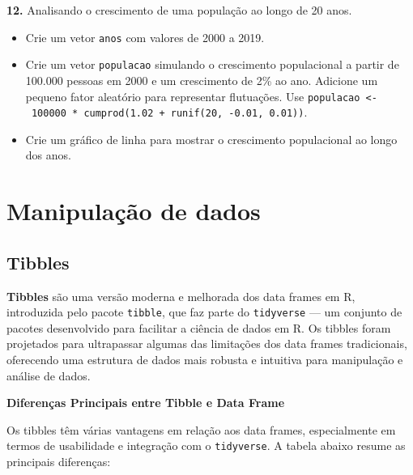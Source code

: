 \documentclass[
]{book}
\providecommand{\tightlist}{%
  \setlength{\itemsep}{0pt}\setlength{\parskip}{0pt}}
\begin{document}
\textbf{12.} Analisando o crescimento de uma população ao longo de 20 anos.

\begin{itemize}
\tightlist
\item
  Crie um vetor \texttt{anos} com valores de 2000 a 2019.
\item
  Crie um vetor \texttt{populacao} simulando o crescimento populacional a partir de 100.000 pessoas em 2000 e um crescimento de 2\% ao ano. Adicione um pequeno fator aleatório para representar flutuações. Use \texttt{populacao\ \textless{}-\ 100000\ *\ cumprod(1.02\ +\ runif(20,\ -0.01,\ 0.01))}.
\item
  Crie um gráfico de linha para mostrar o crescimento populacional ao longo dos anos.
\end{itemize}

\chapter{Manipulação de dados}\label{manipulauxe7uxe3o-de-dados}

\section{Tibbles}\label{tibbles}

\textbf{Tibbles} são uma versão moderna e melhorada dos data frames em R,
introduzida pelo pacote \texttt{tibble}, que faz parte do \texttt{tidyverse} --- um
conjunto de pacotes desenvolvido para facilitar a ciência de dados em R.
Os tibbles foram projetados para ultrapassar algumas das limitações dos
data frames tradicionais, oferecendo uma estrutura de dados mais robusta
e intuitiva para manipulação e análise de dados.

\textbf{Diferenças Principais entre Tibble e Data Frame}

Os tibbles têm várias vantagens em relação aos data frames,
especialmente em termos de usabilidade e integração com o \texttt{tidyverse}. A
tabela abaixo resume as principais diferenças:
\end{document}
